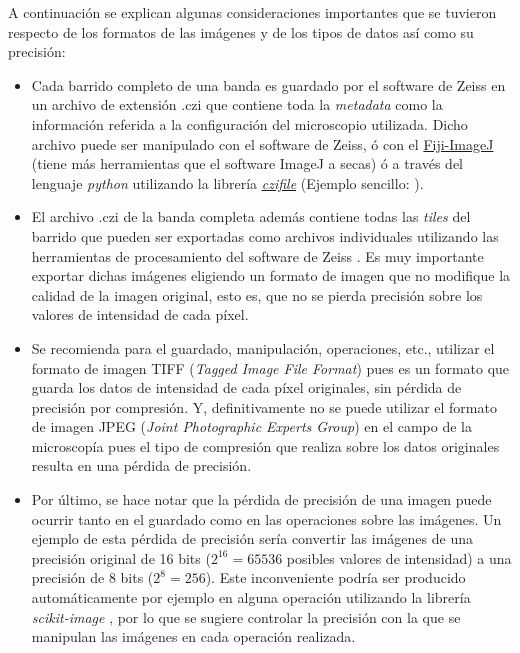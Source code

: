 A continuación se explican algunas consideraciones importantes que se tuvieron respecto de los formatos de las imágenes y de los tipos de datos así como su precisión:
\begin{itemize}
\justifying
\item Cada barrido completo de una banda es guardado por el software de Zeiss en un archivo de extensión .czi que contiene toda la \textit{metadata} como la información referida a la configuración del microscopio utilizada. Dicho archivo puede ser manipulado con el software de Zeiss, ó con el \href{https://imagej.net/Fiji}{Fiji-ImageJ} (tiene más herramientas que el software ImageJ a secas) ó a través del lenguaje \textit{python} utilizando la librería \href{https://pypi.org/project/czifile/}{\textit{czifile}} (Ejemplo sencillo: \href{https://github.com/jrr1984/defects_analysis/blob/master/zeiss_cfi.ipynb}{\faGithub}).
\item El archivo .czi de la banda completa además contiene todas las \textit{tiles} del barrido que pueden ser exportadas como archivos individuales utilizando las herramientas de procesamiento del software de Zeiss \cite{tilezeiss}. Es muy importante exportar dichas imágenes eligiendo un formato de imagen que no modifique la calidad de la imagen original, esto es, que no se pierda precisión sobre los valores de intensidad de cada píxel. 
\item Se recomienda para el guardado, manipulación, operaciones, etc., utilizar el formato de imagen TIFF (\textit{Tagged Image File Format}) pues es un formato que guarda los datos de intensidad de cada píxel originales, sin pérdida de precisión por compresión. Y, definitivamente no se puede utilizar el formato de imagen JPEG (\textit{Joint Photographic Experts Group}) en el campo de la microscopía pues el tipo de compresión que realiza sobre los datos originales resulta en una pérdida de precisión.
\item Por último, se hace notar que la pérdida de precisión de una imagen puede ocurrir tanto en el guardado como en las operaciones sobre las imágenes. Un ejemplo de esta pérdida de precisión sería convertir las imágenes de una precisión original de 16 bits ($2^{16} = 65536$ posibles valores de intensidad) a una precisión de 8 bits ($2^{8} = 256$). Este inconveniente podría ser producido automáticamente por ejemplo en alguna operación utilizando la librería \textit{scikit-image} \cite{van2014scikit}, por lo que se sugiere controlar la precisión con la que se manipulan las imágenes en cada operación realizada.
\end{itemize}


